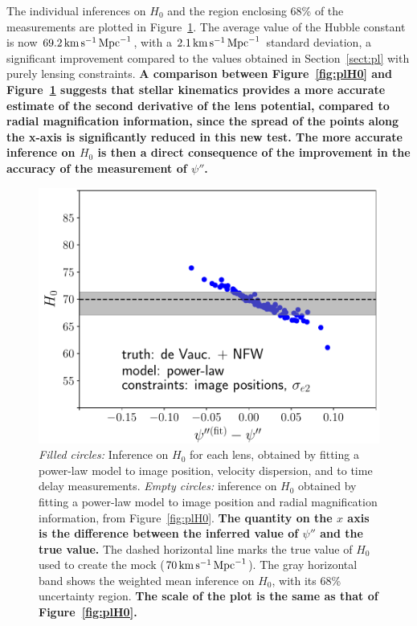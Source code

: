 \documentclass[usenatbib]{mnras}
\def\psiii{\psi''}
\def\Hunit{\,\rm{km}\,{s}^{-1}\,\rm{Mpc}^{-1}}
\def\Sref#1{Section~\ref{#1}\xspace}
\def\Fref#1{Figure~\ref{#1}\xspace}
\begin{document}
The individual inferences on $H_0$ and the region enclosing 68\% of the measurements are plotted in \Fref{fig:pl_indH0_wdyn}.
The average value of the Hubble constant is now $69.2\Hunit$, with a $2.1\Hunit$ standard deviation, a significant improvement compared to the values obtained in \Sref{sect:pl} with purely lensing constraints.
{\bf A comparison between \Fref{fig:plH0} and \Fref{fig:pl_indH0_wdyn} suggests that stellar kinematics provides a more accurate estimate of the second derivative of the lens potential, compared to radial magnification information, since the spread of the points along the x-axis is significantly reduced in this new test.
The more accurate inference on $H_0$ is then a direct consequence of the improvement in the accuracy of the measurement of $\psiii$.
}
%
\begin{figure}
 \includegraphics[width=\columnwidth]{pl_impos_dyn_individual_H0.pdf}
 \caption{{\em Filled circles:} Inference on $H_0$ for each lens, obtained by fitting a power-law model to image position, velocity dispersion, and to time delay measurements.
{\em Empty circles:} inference on $H_0$ obtained by fitting a power-law model to image position and radial magnification information, from \Fref{fig:plH0}.
{\bf The quantity on the $x$ axis is the difference between the inferred value of $\psiii$ and the true value.} The dashed horizontal line marks the true value of $H_0$ used to create the mock ($70\,\rm{km}\,\rm{s}^{-1}\,\rm{Mpc}^{-1}$).
The gray horizontal band shows the weighted mean inference on $H_0$, with its 68\% uncertainty region.
{\bf The scale of the plot is the same as that of \Fref{fig:plH0}.}}
 \label{fig:pl_indH0_wdyn}
\end{figure}
%
\end{document}
